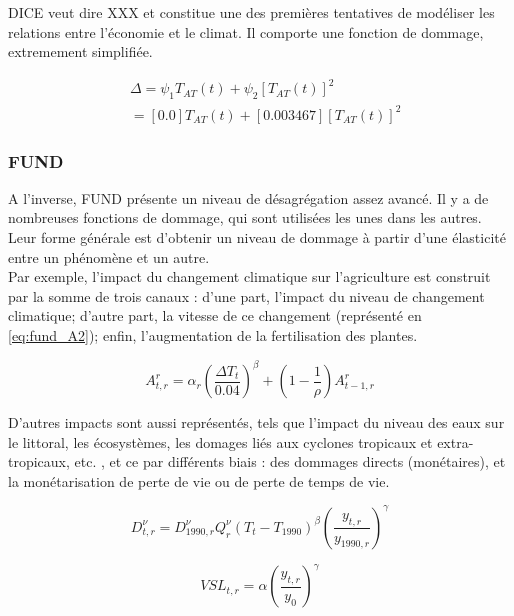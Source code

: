 DICE veut dire XXX et constitue une des premières tentatives de modéliser les relations entre l'économie et le climat. Il comporte une fonction de dommage, extremement simplifiée. 

\begin{equation}
\begin{array}{ll}
    & \displaystyle  \Delta = \psi_{1}T_{AT}(t) + \psi_{2}[T_{AT}(t)]^{2} \\
    & = [0.0]T_{AT}(t) + [0.003467][T_{AT}(t)]^{2}
\end{array}
\label{eq:df_dice2023}
\end{equation}

\subsubsection{FUND} 

A l'inverse, FUND présente un niveau de désagrégation assez avancé. Il y a de nombreuses fonctions de dommage, qui sont utilisées les unes dans les autres. Leur forme générale est d'obtenir un niveau de dommage à partir d'une élasticité entre un phénomène et un autre. \\

Par exemple, l'impact du changement climatique sur l'agriculture est construit par la somme de trois canaux : d'une part, l'impact du niveau de changement climatique; d'autre part, la vitesse de ce changement (représenté en \ref{eq:fund_A2}); enfin, l'augmentation de la fertilisation des plantes. 

\begin{equation}
    A_{t,r}^{r}=\alpha_{r}\left(\frac{\Delta T_{t}}{0.04}\right)^{\beta}+\left(1-\frac{1}{\rho}\right)A_{t-1,r}^{r}
    \label{eq:fund_A2}
\end{equation}

D'autres impacts sont aussi représentés, tels que l'impact du niveau des eaux sur le littoral, les écosystèmes, les domages liés aux cyclones tropicaux et extra-tropicaux, etc. , et ce par différents biais : des dommages directs (monétaires), et la monétarisation de perte de vie ou de perte de temps de vie. 

\begin{equation}
    D_{t,r}^{\nu}=D_{1990,r}^{\nu}Q_{r}^{\nu}\left(T_{t}-T_{1990}\right)^{\beta}\left(\frac{y_{t,r}}{y_{1990,r}}\right)^{\gamma}
    \label{eq:fund_HV}
\end{equation}

\begin{equation}
    V S L_{t,r}=\alpha\left(\frac{y_{t,r}}{y_{0}}\right)^{\gamma}
    \label{eq:VSL}
\end{equation}

